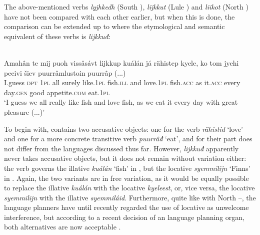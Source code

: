 \documentclass[output=paper]{LSP/langsci}
\begin{document}
 The above-mentioned verbs \textit{lyjhkedh} (South ), \textit{lijkkut} (Lule ) and \textit{liikot} (North ) have not been compared with each other earlier, but when this is done, the comparison can be extended up to   where the etymological and semantic equivalent of these verbs is \textit{lijkkuđ}:

\begin{exe}
\ex%
\label{16-ki-ex:14}
 \\
\gll Amahân te mij puoh vissâsávt lijkkup kuálán já rähistep kyele, ko tom jyehi peeivi šiev puurrâmlustoin puurrâp (...) \\
I.guess \textsc{dpt} \textsc{1pl} all surely like.\textsc{1pl} fish.\textsc{ill} and love.\textsc{1pl} fish.\textsc{acc}  as it.\textsc{acc} every day.\textsc{gen} good appetite.\textsc{com} eat.\textsc{1pl}\\
\glt ‘I guess we all really like fish and love fish, as we eat it every day with great pleasure (...)’

\end{exe}


To begin with,  contains two accusative objects: one for the  verb \textit{rähistiđ} ‘love’ and one for a more concrete transitive verb \textit{puurrâđ} ‘eat’, and for their part   does not differ from the languages discussed thus far. However, \textit{lijkkuđ} apparently never takes accusative objects, but it does not remain without variation either: the verb governs the illative \textit{kuálán} ‘fish’ in , but the locative \textit{syemmilijn} ‘Finns’ in . Again, the two variants are in free variation, as it would be equally possible to replace the illative \textit{kuálán} with the locative \textit{kyeleest}, or, vice versa, the locative \textit{syemmilijn} with the illative \textit{syemmiláid}. Furthermore, quite like with North  --, the   language planners have until recently regarded the use of locative as unwelcome  interference, but according to a recent decision of an   language planning organ, both alternatives are now acceptable \citep[86–87]{Olthuis2009Mii}.
\end{document}
